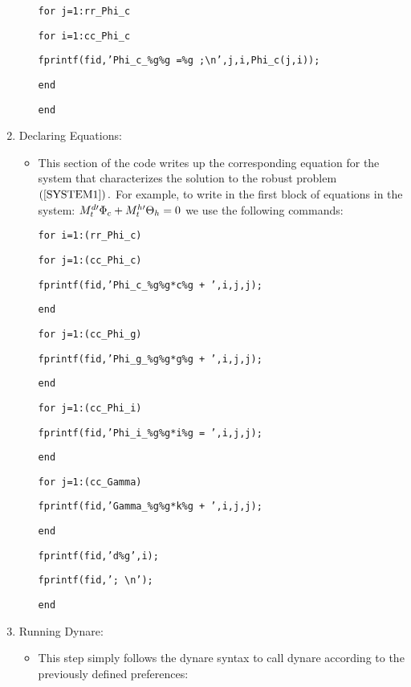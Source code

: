 \documentclass[letter, fleqn, 11pt]{article}
\begin{document}
\begin{enumerate}
\begin{itemize}
\texttt{for j=1:rr\_Phi\_c}

\texttt{\qquad for i=1:cc\_Phi\_c}

\texttt{\qquad \qquad fprintf(fid,'Phi\_c\_\%g\%g =\%g ;\textbackslash n',j,i,Phi\_c(j,i));}

\texttt{\qquad end}

\texttt{end}
\end{itemize}

\item Declaring Equations:

\begin{itemize}
\item This section of the code writes up the corresponding equation for the
system that characterizes the solution to the robust problem $\left( \ref%
{SYSTEM1}\right) .$ For example, to write in the first block of equations in
the system: ${\scriptsize M}_{t}^{d\prime }\Phi _{c}+{\scriptsize M}%
_{t}^{h\prime }\Theta _{h}=0$ we use the following commands:

\texttt{for i=1:(rr\_Phi\_c)}

\qquad \texttt{for j=1:(cc\_Phi\_c)}

\qquad \qquad \texttt{fprintf(fid,'Phi\_c\_\%g\%g*c\%g + ',i,j,j); }

\qquad \texttt{end}

\qquad \texttt{for j=1:(cc\_Phi\_g)}

\qquad \qquad \texttt{fprintf(fid,'Phi\_g\_\%g\%g*g\%g + ',i,j,j); }

\qquad \texttt{end}

\qquad \texttt{for j=1:(cc\_Phi\_i)}

\qquad \qquad \texttt{fprintf(fid,'Phi\_i\_\%g\%g*i\%g = ',i,j,j); }

\qquad \texttt{end}

\qquad \texttt{for j=1:(cc\_Gamma)}

\qquad \qquad \texttt{fprintf(fid,'Gamma\_\%g\%g*k\%g + ',i,j,j); }

\qquad \texttt{end}

\qquad \texttt{fprintf(fid,'d\%g',i); }

\qquad \texttt{fprintf(fid,'; \textbackslash n'); }

\texttt{end}
\end{itemize}

\item Running Dynare:

\begin{itemize}
\item This step simply follows the dynare syntax to call dynare according to the previously defined preferences:


\end{itemize}
\end{enumerate}
\end{document}
